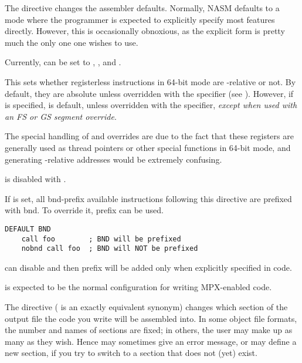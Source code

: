 The  directive changes the assembler defaults. Normally,
NASM defaults to a mode where the programmer is expected to explicitly
specify most features directly. However, this is occasionally obnoxious,
as the explicit form is pretty much the only one one wishes to use.

Currently,  can be set to , , 
and .


This sets whether registerless instructions in 64-bit mode are
-relative or not. By default, they are absolute unless
overridden with the  specifier (see ).
However, if  is specified,  is default, unless
overridden with the  specifier, \emph{except when used with an
FS or GS segment override}.

The special handling of  and  overrides are due to the
fact that these registers are generally used as thread pointers or
other special functions in 64-bit mode, and generating
-relative addresses would be extremely confusing.

 is disabled with .


If  is set, all bnd-prefix available instructions
following this directive are prefixed with bnd. To override it,
 prefix can be used.

\begin{lstlisting}
DEFAULT BND
    call foo        ; BND will be prefixed
    nobnd call foo  ; BND will NOT be prefixed
\end{lstlisting}

 can disable  and then
 prefix will be added only when explicitly specified
in code.

 is expected to be the normal configuration
for writing MPX-enabled code.


The  directive ( is an exactly equivalent
synonym) changes which section of the output file the code you write
will be assembled into. In some object file formats, the number and
names of sections are fixed; in others, the user may make up as many
as they wish. Hence  may sometimes give an error message,
or may define a new section, if you try to switch to a section that does
not (yet) exist.

